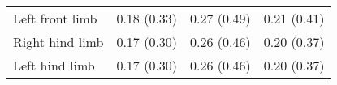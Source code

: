 \begin{table}[htb]
{\begin{tabular}[H]{p{2cm}m{2cm}m{2cm}m{2cm}}
\multicolumn{1}{l}{Left front limb}& \multicolumn{1}{c}{0.18 (0.33)} &   \multicolumn{1}{c}{0.27 (0.49)} & \multicolumn{1}{c}{0.21 (0.41)} \\ 

\multicolumn{1}{l}{Right hind limb}& \multicolumn{1}{c}{0.17 (0.30)} &   \multicolumn{1}{c}{0.26 (0.46)} & \multicolumn{1}{c}{0.20 (0.37)} \\ 

\multicolumn{1}{l}{Left hind limb}& \multicolumn{1}{c}{0.17 (0.30)} &   \multicolumn{1}{c}{0.26 (0.46)} & \multicolumn{1}{c}{0.20 (0.37)} \\ 


    
        \bottomrule
    \end{tabular}}
    \label{imumocap_table}
\end{table}